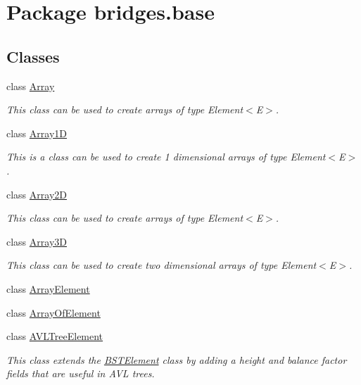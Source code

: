 \hypertarget{namespacebridges_1_1base}{}\section{Package bridges.\+base}
\label{namespacebridges_1_1base}
\subsection*{Classes}
\begin{DoxyCompactItemize}
\item 
class \mbox{\hyperlink{classbridges_1_1base_1_1_array}{Array}}
\begin{DoxyCompactList}\small\item\em This class can be used to create arrays of type Element$<$\+E$>$. \end{DoxyCompactList}\item 
class \mbox{\hyperlink{classbridges_1_1base_1_1_array1_d}{Array1D}}
\begin{DoxyCompactList}\small\item\em This is a class can be used to create 1 dimensional arrays of type Element$<$\+E$>$. \end{DoxyCompactList}\item 
class \mbox{\hyperlink{classbridges_1_1base_1_1_array2_d}{Array2D}}
\begin{DoxyCompactList}\small\item\em This class can be used to create arrays of type Element$<$\+E$>$. \end{DoxyCompactList}\item 
class \mbox{\hyperlink{classbridges_1_1base_1_1_array3_d}{Array3D}}
\begin{DoxyCompactList}\small\item\em This class can be used to create two dimensional arrays of type Element$<$\+E$>$. \end{DoxyCompactList}\item 
class \mbox{\hyperlink{classbridges_1_1base_1_1_array_element}{Array\+Element}}
\item 
class \mbox{\hyperlink{classbridges_1_1base_1_1_array_of_element}{Array\+Of\+Element}}
\item 
class \mbox{\hyperlink{classbridges_1_1base_1_1_a_v_l_tree_element}{A\+V\+L\+Tree\+Element}}
\begin{DoxyCompactList}\small\item\em This class extends the \mbox{\hyperlink{classbridges_1_1base_1_1_b_s_t_element}{B\+S\+T\+Element}} class by adding a height and balance factor fields that are useful in A\+VL trees. \end{DoxyCompactList}\item 

\end{DoxyCompactItemize}
